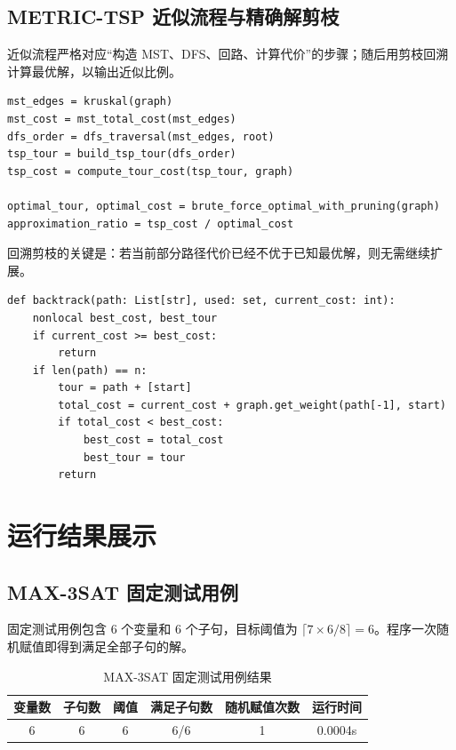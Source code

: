 \documentclass{sysucseexp}
\begin{document}
\subsection{METRIC-TSP 近似流程与精确解剪枝}

近似流程严格对应“构造 MST、DFS、回路、计算代价”的步骤；随后用剪枝回溯计算最优解，以输出近似比例。

{\small
\begin{verbatim}
mst_edges = kruskal(graph)
mst_cost = mst_total_cost(mst_edges)
dfs_order = dfs_traversal(mst_edges, root)
tsp_tour = build_tsp_tour(dfs_order)
tsp_cost = compute_tour_cost(tsp_tour, graph)

optimal_tour, optimal_cost = brute_force_optimal_with_pruning(graph)
approximation_ratio = tsp_cost / optimal_cost
\end{verbatim}
}

回溯剪枝的关键是：若当前部分路径代价已经不优于已知最优解，则无需继续扩展。

{\small
\begin{verbatim}
def backtrack(path: List[str], used: set, current_cost: int):
    nonlocal best_cost, best_tour
    if current_cost >= best_cost:
        return
    if len(path) == n:
        tour = path + [start]
        total_cost = current_cost + graph.get_weight(path[-1], start)
        if total_cost < best_cost:
            best_cost = total_cost
            best_tour = tour
        return
\end{verbatim}
}

\section{运行结果展示}

\subsection{MAX-3SAT 固定测试用例}

固定测试用例包含 6 个变量和 6 个子句，目标阈值为 $\lceil 7\times 6/8\rceil=6$。程序一次随机赋值即得到满足全部子句的解。

\begin{table}[htbp]
  \centering
  \caption{MAX-3SAT 固定测试用例结果}
  \begin{tabular}{cccccc}
    \toprule
    变量数 & 子句数 & 阈值 & 满足子句数 & 随机赋值次数 & 运行时间 \\
    \midrule
    6 & 6 & 6 & 6/6 & 1 & 0.0004s \\
    \bottomrule
  \end{tabular}
\end{table}
\end{document}
